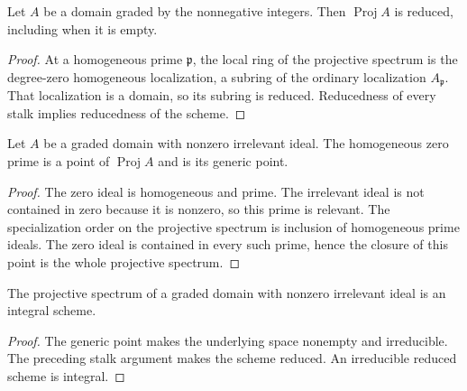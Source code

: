 \begingroup

\begin{lemma}
\label{lem:proj-domain-reduced}
\leanok
Let $A$ be a domain graded by the nonnegative integers. Then
$\operatorname{Proj}A$ is reduced, including when it is empty.
\end{lemma}
\begin{proof}
At a homogeneous prime $\mathfrak p$, the local ring of the projective
spectrum is the degree-zero homogeneous localization, a subring of the
ordinary localization $A_{\mathfrak p}$. That localization is a domain,
so its subring is reduced. Reducedness of every stalk implies reducedness
of the scheme.
\end{proof}

\endgroup

\begingroup

\begin{lemma}
\label{lem:proj-domain-generic-point}
\leanok
Let $A$ be a graded domain with nonzero irrelevant ideal. The homogeneous
zero prime is a point of $\operatorname{Proj}A$ and is its generic point.
\end{lemma}
\begin{proof}
The zero ideal is homogeneous and prime. The irrelevant ideal is not
contained in zero because it is nonzero, so this prime is relevant.
The specialization order on the projective spectrum is inclusion of
homogeneous prime ideals. The zero ideal is contained in every such
prime, hence the closure of this point is the whole projective spectrum.
\end{proof}

\endgroup

\begingroup

\begin{theorem}
\label{thm:proj-domain-integral}
\leanok
The projective spectrum of a graded domain with nonzero irrelevant ideal
is an integral scheme.
\end{theorem}
\begin{proof}
The generic point makes the underlying space nonempty and irreducible.
The preceding stalk argument makes the scheme reduced. An irreducible
reduced scheme is integral.
\end{proof}


